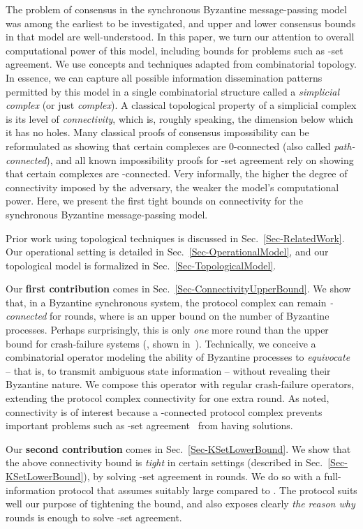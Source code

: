 \documentclass[11pt]{article}
\begin{document}
The problem of consensus in the synchronous Byzantine message-passing
model was among the earliest to be investigated,
and upper and lower consensus bounds in that model are well-understood.
In this paper,
we turn our attention to overall computational power of this model,
including bounds for problems such as -set agreement.
We use concepts and techniques adapted from combinatorial topology.
In essence,
we can capture all possible information dissemination patterns
permitted by this model in a single combinatorial structure called a
\emph{simplicial complex} (or just \emph{complex}).
A classical topological property of a simplicial complex is its level
of \emph{connectivity}, which is, roughly speaking, the dimension below
which it has no holes.
Many classical proofs of consensus impossibility can be reformulated
as showing that certain complexes are 0-connected
(also called \emph{path-connected}),
and all known impossibility proofs for -set agreement rely on
showing that certain complexes are -connected.
Very informally, the higher the degree of connectivity imposed by the adversary,
the weaker the model's computational power.
Here, we present the first tight bounds on connectivity for the
synchronous Byzantine message-passing model.

Prior work using topological techniques is discussed in Sec.~\ref{Sec-RelatedWork}.
Our operational setting is detailed in Sec.~\ref{Sec-OperationalModel},
and our topological model is formalized in Sec.~\ref{Sec-TopologicalModel}.

Our \textbf{first contribution} comes in Sec.~\ref{Sec-ConnectivityUpperBound}.
We show that,
in a Byzantine synchronous system,
the protocol complex can remain \emph{-connected} for  rounds,
where  is an upper bound on the number of Byzantine processes.
Perhaps surprisingly,
this is only \emph{one} more round than the upper bound for crash-failure systems
(, shown in~\cite{ChaudhuriHLT2000}).
Technically,
we conceive a combinatorial operator modeling the ability of Byzantine processes
to \emph{equivocate} -- that is,
to transmit ambiguous state information --
without revealing their Byzantine nature.
We compose this operator with regular crash-failure operators,
extending the protocol complex connectivity for one extra round.
As noted, connectivity is of interest because a -connected
protocol complex prevents important problems such as -set
agreement~\cite{ksetagreement,dePriscoMR2001} from having solutions.

Our \textbf{second contribution} comes in Sec.~\ref{Sec-KSetLowerBound}.
We show that the above connectivity bound
is \emph{tight} in certain settings (described in Sec.~\ref{Sec-KSetLowerBound}),
by solving -set agreement in  rounds.
We do so with a full-information protocol that assumes  suitably large compared to .
The protocol suits well our purpose of tightening the  bound,
and also exposes clearly \emph{the reason why}  rounds is enough
to solve -set agreement.
\end{document}
